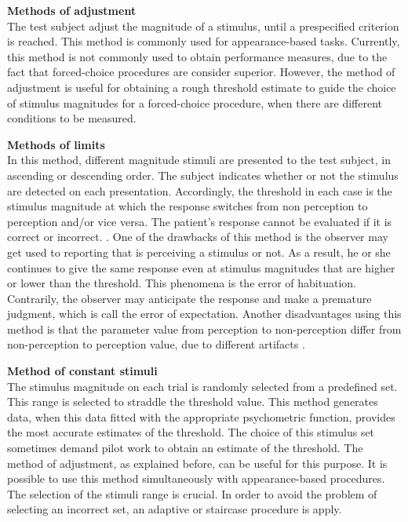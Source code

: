 
\textbf{Methods of adjustment}
\\
The test subject adjust the magnitude of a stimulus, until a prespecified criterion is reached. This method is commonly used for appearance-based tasks. Currently, this method is not commonly used to obtain performance measures, due to the fact that forced-choice procedures are consider superior. However, the method of adjustment is useful for obtaining a rough threshold estimate to guide the choice of stimulus magnitudes for a forced-choice procedure, when there are different conditions to be measured.

\textbf{Methods of limits} 
\\
In this method, different magnitude stimuli are presented to the test subject, in ascending or descending order. The subject indicates whether or not the stimulus are detected on each presentation. Accordingly, the threshold in each case is the stimulus magnitude at which the response switches from non perception to perception and/or vice versa. The patient's response cannot be evaluated if it is correct or incorrect. \cite{chapter3}. One of the drawbacks of this method  is the observer may get used to reporting that is perceiving a stimulus or not. As a result, he or she  continues to give the same response even at stimulus magnitudes that are higher or lower than the threshold. This phenomena is the error of habituation. Contrarily, the observer may anticipate the response and make a premature judgment, which is call the error of expectation. Another disadvantages using this method is that the parameter value from perception to non-perception differ from non-perception to perception value, due to different artifacts \cite{hysteresis}.

\textbf{Method of constant stimuli}
\\
The stimulus magnitude on each trial is randomly selected from a predefined set. This range is selected to straddle the threshold value. This method generates data, when this data fitted with the appropriate psychometric function, provides the most accurate estimates of the threshold. The choice of this stimulus set sometimes demand pilot work to obtain an estimate of the threshold. The method of adjustment, as explained before, can be useful for this purpose. It is possible to use this method simultaneously with appearance-based procedures. The selection of the stimuli range is crucial. In order to avoid the problem of selecting an incorrect set, an adaptive or staircase procedure is apply.

